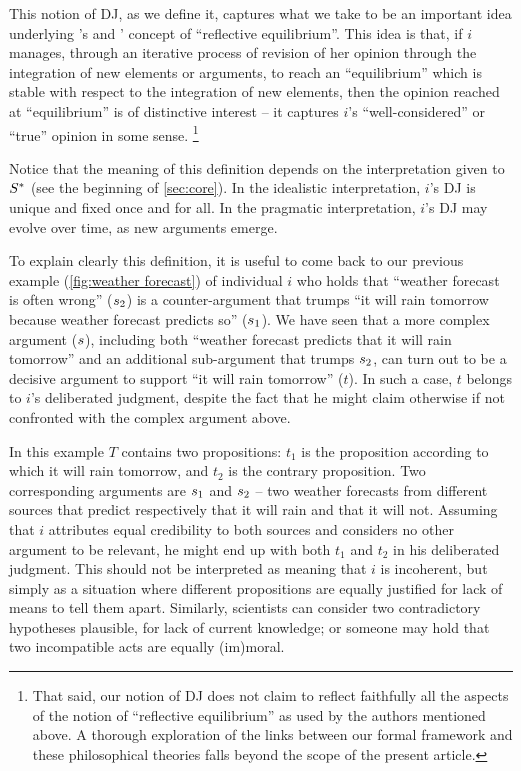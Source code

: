\documentclass[version=3.21, pagesize, twoside=off, bibliography=totoc, DIV=calc, fontsize=12pt, a4paper]{scrartcl}
\begin{document}
This notion of \ac{DJ}, as we define it, captures what we take to be an important idea underlying \citeauthor{goodman_fact_1983}’s \citeyearpar{goodman_fact_1983} and \citeauthor{rawls_theory_1999}’ \citeyearpar{rawls_theory_1999} concept of “reflective equilibrium”. This idea is that, if $i$ manages, through an iterative process of revision of her opinion through the integration of new elements or arguments, to reach an “equilibrium” which is stable with respect to the integration of new elements, then the opinion reached at “equilibrium” is of distinctive interest -- it captures $i$'s “well-considered” or “true” opinion in some sense.%
\footnote{That said, our notion of \ac{DJ} does not claim to reflect faithfully all the aspects of the notion of “reflective equilibrium” as used by the authors mentioned above. A thorough exploration of the links between our formal framework and these philosophical theories falls beyond the scope of the present article.}

Notice that the meaning of this definition depends on the interpretation given to $S^*$ (see the beginning of \cref{sec:core}).
 In the idealistic interpretation, $i$'s \ac{DJ} is unique and fixed once and for all. In the pragmatic interpretation, $i$'s \ac{DJ} may evolve over time, as new arguments emerge.

\begin{example}
\label{ex:weather forecast2}
To explain clearly this definition, it is useful to come back to our previous example (\cref{fig:weather forecast}) of individual $i$ who holds that “weather forecast is often wrong” ($s_2$) is a counter-argument that trumps “it will rain tomorrow because weather forecast predicts so” ($s_1$). We have seen that a more complex argument ($s$), including both “weather forecast predicts that it will rain tomorrow” and an additional sub-argument that trumps $s_2$, can turn out to be a decisive argument to support “it will rain tomorrow” ($t$). In such a case, $t$ belongs to $i$'s deliberated judgment, despite the fact that he might claim otherwise if not confronted with the complex argument above.
\end{example}

\begin{example}
\label{ex:weather forecast contr}
	In this example $T$ contains two propositions: $t_1$ is the proposition according to which it will rain tomorrow, and $t_2$ is the contrary proposition. Two corresponding arguments are $s_1$ and $s_2$ -- two weather forecasts from different sources that predict respectively that it will rain and that it will not. Assuming that $i$ attributes equal credibility to both sources and considers no other argument to be relevant, he might end up with both $t_1$ and $t_2$ in his deliberated judgment. This should not be interpreted as meaning that $i$ is incoherent, but simply as a situation where different propositions are equally justified for lack of means to tell them apart. Similarly, scientists can consider two contradictory hypotheses plausible, for lack of current knowledge; or someone may hold that two incompatible acts are equally (im)moral.
\end{example}
\end{document}
